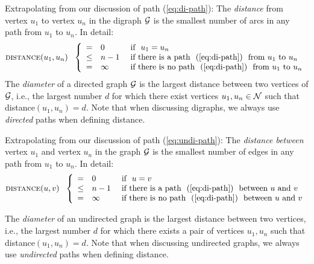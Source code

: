 
Extrapolating from our discussion of path (\ref{eq:di-path}): The {\it distance} from vertex $u_1$ to vertex $u_n$ in the digraph $\mbox{$\cal G$}$ is the smallest number of arcs in any path from $u_1$ to $u_n$.  In detail:
\begin{equation}
\label{eq:di-distance-defn}
 \mbox{\sc distance}(u_1, u_n) \ \ \left\{
\begin{array}{cll}
= & 0 & \mbox{  if  } \ u_1 = u_n \\
\leq & n-1 & \mbox{  if there is a path } \ (\ref{eq:di-path})
\ \mbox{ from $u_1$ to $u_n$} \\
= & \infty & \mbox{  if there is no path } \ (\ref{eq:di-path})
\ \mbox{ from $u_1$ to $u_n$}
\end{array}
\right.
\end{equation}
The {\it diameter} of a directed graph $\mbox{$\cal G$}$ is the largest distance between two vertices of $\mbox{$\cal G$}$, i.e., the largest number $d$ for which there exist vertices $u_1, u_n \in \mbox{$\cal N$}$ such that {\sc distance}$(u_1, u_n) = d$.  Note that when discussing digraphs, we always use {\em directed} paths when defining distance.

  

\medskip


Extrapolating from our discussion of path (\ref{eq:undi-path}): The {\it distance between} vertex $u_1$ and vertex $u_n$ in the graph $\mbox{$\cal G$}$ is the smallest number of edges in any path from $u_1$ to $u_n$.  In detail:
\begin{equation}
\label{eq:distance-defn}
 \mbox{\sc distance}(u, v) \ \ \left\{
\begin{array}{cll}
= & 0 & \mbox{  if  } \ u = v \\
\leq & n-1 & \mbox{  if there is a path } \ (\ref{eq:di-path})
\ \mbox{ between $u$ and $v$} \\
= & \infty & \mbox{  if there is no path } \ (\ref{eq:di-path})
\ \mbox{ between $u$ and $v$}
\end{array}
\right.
\end{equation}

 
The {\it diameter} of an undirected graph is the largest distance between two vertices,  i.e., the largest number $d$ for which there exists a pair of vertices $u_1, u_n$ such that {\sc distance}$(u_1, u_n) = d$.  Note that when discussing undirected graphs, we always use {\em undirected} paths when defining distance.



